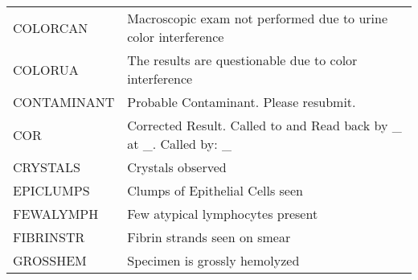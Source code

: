 \begin{fullwidth}
\begin{longtable}{p{.20\linewidth} p{.75\linewidth}}
COLORCAN    & Macroscopic exam not performed due to urine color interference                                                                                                                                                                                                                               \\
COLORUA     & The results are questionable due to color interference                                                                                                                                                                                                                                       \\
CONTAMINANT & Probable Contaminant. Please resubmit.                                                                                                                                                                                                                                                       \\
COR         & Corrected Result. Called to and Read back by \_ at \_. Called by: \_
                                                                \\
CRYSTALS    & Crystals observed                                                                                                                                                                                                                                                                            \\
EPICLUMPS   & Clumps of Epithelial Cells seen                                                                                                                                                                                                                                                              \\
FEWALYMPH   & Few atypical lymphocytes present                                                                                                                                                                                                                                                             \\
FIBRINSTR   & Fibrin strands seen on smear                                                                                                                                                                                                                                                                 \\
GROSSHEM    & Specimen is grossly hemolyzed                                                                                                                                                                                                                                                                \\

\end{longtable}
\end{fullwidth}
